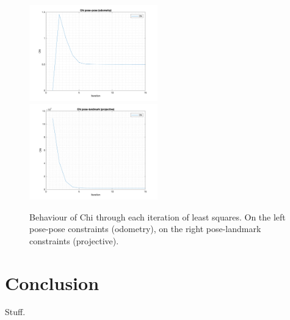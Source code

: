 \documentclass[11pt]{extarticle}
\begin{document}
\begin{figure}
    \centering
    \includegraphics[width=0.495\textwidth]{matlab/chi-pose-pose-odom.png}
    \includegraphics[width=0.495\textwidth]{matlab/chi-pose-landmark-proj.png}
    \caption{Behaviour of Chi through each iteration of least squares. On
        the left pose-pose constraints (odometry), on the right pose-landmark
        constraints (projective).}
    \label{fig:chi}
\end{figure}

\section{Conclusion}
Stuff.

\clearpage


\end{document}
